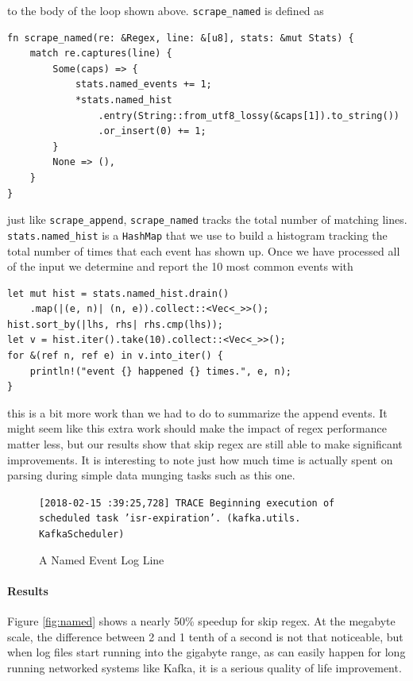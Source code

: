 to the body of the loop shown above. \verb'scrape_named'
is defined as

\begin{verbatim}
fn scrape_named(re: &Regex, line: &[u8], stats: &mut Stats) {
    match re.captures(line) {
        Some(caps) => {
            stats.named_events += 1;
            *stats.named_hist
                .entry(String::from_utf8_lossy(&caps[1]).to_string())
                .or_insert(0) += 1;
        }
        None => (),
    }
}
\end{verbatim}

just like \verb'scrape_append', \verb'scrape_named'
tracks the total number of matching lines. \verb'stats.named_hist'
is a \verb'HashMap' that we use to build a histogram tracking the
total number of times that each event has shown up. Once we have
processed all of the input we determine and report the 10 most common
events with

\begin{verbatim}
let mut hist = stats.named_hist.drain()
    .map(|(e, n)| (n, e)).collect::<Vec<_>>();
hist.sort_by(|lhs, rhs| rhs.cmp(lhs));
let v = hist.iter().take(10).collect::<Vec<_>>();
for &(ref n, ref e) in v.into_iter() {
    println!("event {} happened {} times.", e, n);
}
\end{verbatim}

this is a bit more work than we had to do to summarize the append
events. It might seem like this extra work should make the impact
of regex performance matter less, but our results show that
skip regex are still able to make significant improvements.
It is interesting to note just how much time is actually spent
on parsing during simple data munging tasks such as this one.

\begin{figure}
\caption{A Named Event Log Line}
\label{fig:namedevent}

\texttt{[2018-02-15 :39:25,728] \allowbreak TRACE \allowbreak
Beginning execution \allowbreak of scheduled \allowbreak
task 'isr-expiration'\allowbreak . \allowbreak(kafka.utils.\allowbreak
KafkaScheduler)
}
\end{figure}


\paragraph{Results}

Figure \ref{fig:named} shows a nearly 50\% speedup for skip regex.
At the megabyte scale, the difference between 2 and 1 tenth of
a second is not that noticeable, but when log files start running
into the gigabyte range, as can easily happen for long running
networked systems like Kafka, it is a serious quality of life
improvement.

